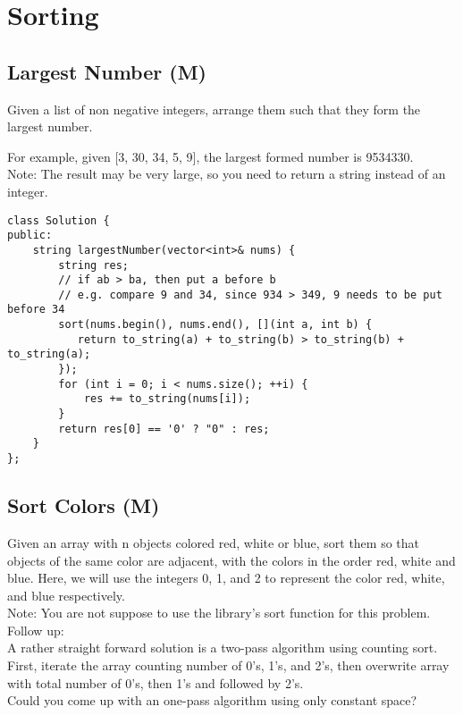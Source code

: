 \chapter{Sorting}
\section{Largest Number (M)}
Given a list of non negative integers, arrange them such that they form the largest number.\

For example, given [3, 30, 34, 5, 9], the largest formed number is 9534330.\\

Note: The result may be very large, so you need to return a string instead of an integer.\\

\begin{lstlisting}
class Solution {
public:
    string largestNumber(vector<int>& nums) {
        string res;
        // if ab > ba, then put a before b
        // e.g. compare 9 and 34, since 934 > 349, 9 needs to be put before 34
        sort(nums.begin(), nums.end(), [](int a, int b) {
           return to_string(a) + to_string(b) > to_string(b) + to_string(a); 
        });
        for (int i = 0; i < nums.size(); ++i) {
            res += to_string(nums[i]);
        }
        return res[0] == '0' ? "0" : res;
    }
};
\end{lstlisting}


\section{Sort Colors (M)}
Given an array with n objects colored red, white or blue, sort them so that objects of the same color are adjacent, with the colors in the order red, white and blue. Here, we will use the integers 0, 1, and 2 to represent the color red, white, and blue respectively.\\

Note: You are not suppose to use the library's sort function for this problem.\\

Follow up:\\
A rather straight forward solution is a two-pass algorithm using counting sort.\\
First, iterate the array counting number of 0's, 1's, and 2's, then overwrite array with total number of 0's, then 1's and followed by 2's.\\
Could you come up with an one-pass algorithm using only constant space?\\


